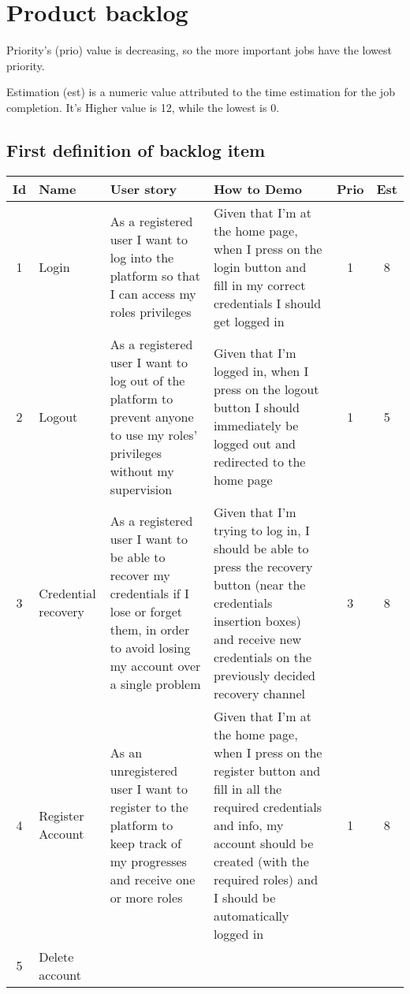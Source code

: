 \section{Product backlog} \label{product_backlog}
Priority's (prio) value is decreasing, so the more important jobs have the lowest priority.

Estimation (est) is a numeric value attributed to the time estimation for the job completion. It's Higher value is 12, while the lowest is 0.


\newpage
\subsection{First definition of backlog item}
\begin{tabular}{|c|m{1.5cm}|m{4cm}|m{4cm}|c|c|}
	\hline
	\textbf{Id}&\textbf{Name}&\textbf{User story}&\textbf{How to Demo}&\textbf{Prio}&\textbf{Est}\\
	\hline
	1 & Login & 
	As a registered user I want to log into the platform so that I can access my roles privileges & 
	Given that I'm at the home page, when I press on the login button and fill in my correct credentials I should get logged in &
	1 & 8 \\
	\hline
	2 & Logout & 
	As a registered user I want to log out of the platform to prevent anyone to use my roles' privileges without my supervision & 
	Given that I'm logged in, when I press on the logout button I should immediately be logged out and redirected to the home page &
	1 & 5 \\
	\hline
	3 & Credential recovery & 
	As a registered user I want to be able to recover my credentials if I lose or forget them, in order to avoid losing my account over a single problem & 
	Given that I'm trying to log in, I should be able to press the recovery button (near the credentials insertion boxes) and receive new credentials on the previously decided recovery channel &
	3 & 8 \\
	\hline
	4 & Register Account & 
	As an unregistered user I want to register to the platform to keep track of my progresses and receive one or more roles & 
	Given that I'm at the home page, when I press on the register button and fill in all the required credentials and info, my account should be created (with the required roles) and I should be automatically logged in &
	1 & 8 \\
	\hline
	5 & Delete account & 

\end{tabular}
